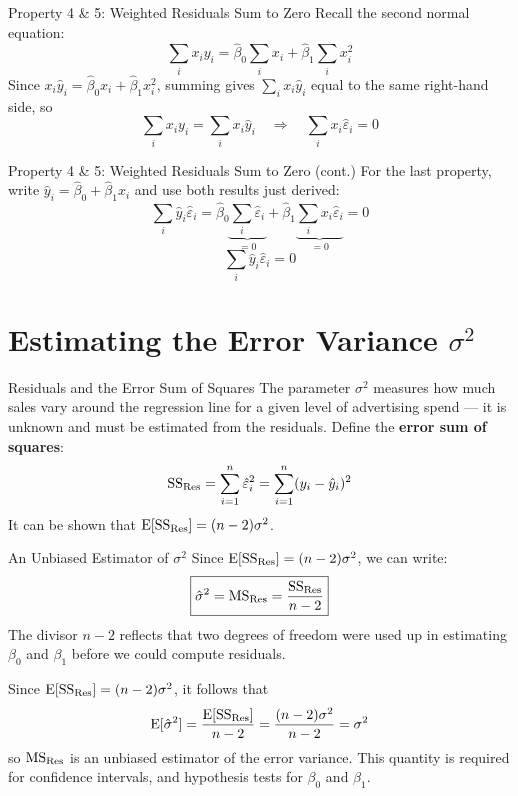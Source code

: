 \begin{frame}{Property 4 \& 5: Weighted Residuals Sum to Zero}
	Recall the second normal equation:
	\[
		\sum_i x_i y_i = \hat\beta_0\sum_i x_i + \hat\beta_1\sum_i x_i^2
	\]
	\pause
	Since $x_i\hat y_i = \hat\beta_0 x_i + \hat\beta_1 x_i^2$, summing gives $\sum_i x_i\hat y_i$ equal to the same right-hand side, so
	\[
		\sum_i x_i y_i = \sum_i x_i \hat y_i \quad\Longrightarrow\quad \boxed{\sum_i x_i\hat\varepsilon_i = 0}
	\]
\end{frame}


\begin{frame}{Property 4 \& 5: Weighted Residuals Sum to Zero (cont.)}
	For the last property, write $\hat y_i = \hat\beta_0 + \hat\beta_1 x_i$ and use both results just derived:
	\[
		\sum_i \hat y_i\hat\varepsilon_i = \hat\beta_0\underbrace{\sum_i \hat\varepsilon_i}_{=0} + \hat\beta_1\underbrace{\sum_i x_i\hat\varepsilon_i}_{=0} = 0
	\]
	\[
		\boxed{\sum_i \hat y_i \hat\varepsilon_i = 0}
	\]
\end{frame}


\section{Estimating the Error Variance \texorpdfstring{$\sigma^2$}{sigma-squared}}


\begin{frame}{Residuals and the Error Sum of Squares}
	The parameter $\sigma^2$ measures how much sales vary around the regression line for a given level of advertising spend --- it is unknown and must be estimated from the residuals.
	\svspace{0.5em}
	Define the \textbf{error sum of squares}:
	\[
		\mathrm{SS}_{\mathrm{Res}} = \sum_{i=1}^n \hat\varepsilon_i^2 = \sum_{i=1}^n (y_i - \hat y_i)^2
	\]
	\pause
	It can be shown that $\operatorname{E}[\mathrm{SS}_{\mathrm{Res}}] = (n-2)\sigma^2$.
\end{frame}


\begin{frame}{An Unbiased Estimator of $\sigma^2$}
	Since $\operatorname{E}[\mathrm{SS}_{\mathrm{Res}}] = (n-2)\sigma^2$, we can write:
	\[
		\boxed{\hat\sigma^2 = \mathrm{MS}_{\mathrm{Res}} = \frac{\mathrm{SS}_{\mathrm{Res}}}{n-2}}
	\]
	The divisor $n-2$ reflects that two degrees of freedom were used up in estimating $\beta_0$ and $\beta_1$ before we could compute residuals.
	
	\svspace{0.5em}

	\pause

	Since $\operatorname{E}[\mathrm{SS}_{\mathrm{Res}}] = (n-2)\sigma^2$, it follows that
	\[
		\operatorname{E}[\hat\sigma^2] = \frac{\operatorname{E}[\mathrm{SS}_{\mathrm{Res}}]}{n-2} = \frac{(n-2) \sigma^2}{n-2} = \sigma^2
	\]
	so $\mathrm{MS}_{\mathrm{Res}}$ is an unbiased estimator of the error variance. This quantity is required for confidence intervals, and hypothesis tests for $\beta_0$ and $\beta_1$.
\end{frame}


